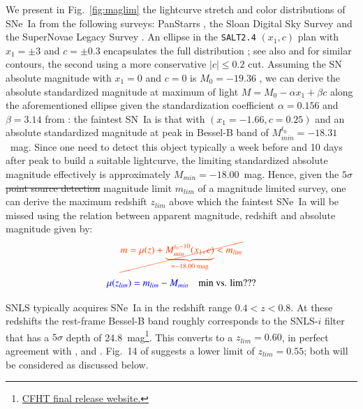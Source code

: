 \documentclass[]{aa} %
\newcommand{\nn}[1]{{\textcolor[rgb]{1, 0.27, 0}{#1}}}
\newcommand{\yc}[1]{{\textcolor{blue}{#1}}}
\begin{document}
We present in Fig.~\ref{fig:maglim} the lightcurve stretch and color
distributions of SNe~Ia from \nn{the following surveys}: PanStarrs
\citep[PS1][]{rest2014}, the Sloan Digital Sky Survey
\citep[SDSS][]{frieman2008} and the SuperNovae Legacy Survey
\citep[SNLS][]{astier2006}. An ellipse in the \textsc{\texttt{SALT2.4}} $(x_1,
c)$ plan with $x_1 = \pm 3$ and $c = \pm 0.3$ encapsulates
the full distribution \citep{guy2007,betoule2014}; see also \citet{bazin2011}
and \citet{campbell2013} for similar contours, the second using a more
conservative $|c| \leq 0.2$ cut. Assuming the SN absolute magnitude with $x_1=0$ and
$c=0$ is $M_0=-19.36$ \citep{kessler2009,scolnic2014}, we can derive the absolute
standardized magnitude at maximum of light $M = M_0 - \alpha x_1 + \beta c$ along the aforementioned ellipse
given the standardization coefficient $\alpha=0.156$ and $\beta=3.14$ from
\cite{scolnic2018a}: the faintest SN~Ia is that with $(x_1=-1.66, c=0.25)$
and an absolute standardized magnitude at peak in Bessel-B band of
$M^{t_0}_{min} = -18.31$~mag. Since one need to detect this object typically a week
before and 10 days after peak to build a suitable lightcurve, the limiting
\nn{standardized} absolute magnitude effectively is approximately
$M_{min} = -18.00$~mag. Hence, given the \nn{\sout{$5\sigma$ point source detection}}
magnitude limit $m_{lim}$ of a magnitude limited survey, one can derive the
maximum redshift $z_{lim}$ above which the faintest SNe~Ia will be missed \nn{using the
relation between apparent magnitude, redshift and absolute magnitude given by:}
\begin{equation}\label{eq:m_lim}
    \nn{\cancel{m = \mu(z) + \underbrace{M_{min}^{t_0-10}(x_1, c)}_{=-18.00\;\text{mag}}
    < m_{lim}}}
\end{equation}
\begin{equation}\label{eq:m_lim}
    \yc{\mu(z_{lim}) = m_{lim} - M_{min}} \quad\text{min vs. lim???}
\end{equation}

SNLS typically acquires SNe~Ia in the redshift range $0.4<z<0.8$. At these
redshifts the rest-frame Bessel-B band roughly corresponds to the SNLS-$i$
filter that has a $5\sigma$ depth of 
24.8~mag\footnote{\href{https://www.cfht.hawaii.edu/Science/CFHTLS/cfhtlsfinalreleaseexecsummary.html}{CFHT final release website.}}. 
This converts to a $z_{lim}=0.60$, in perfect agreement with \cite{neill2006}, \cite{perrett2010} and \cite{bazin2011}. \nn{Fig.~14 of \citealt{perrett2010}
suggests a lower limit of $z_{lim}=0.55$; both will be considered as discussed below.}
\end{document}
